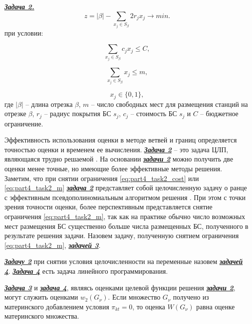 \underline{\textit{\textbf{Задача 2.}}}
\begin{displaymath}
    z = |\beta| - \sum\limits_{x_j \in S_\beta} 2r_j x_j \rightarrow min.
\end{displaymath}
при условии:

\begin{equation}\label{eq:part4_task2_cost}
    \sum\limits_{x_j \in S_\beta} c_j x_j \leqslant C,
\end{equation}

\begin{equation}\label{eq:part4_task2_m}
    \sum\limits_{x_j \in S_\beta} x_j \leqslant m,
\end{equation}

\begin{displaymath}
    x_j \in \{0, 1\},
\end{displaymath}
где $|\beta|$ -- длина отрезка $\beta$, $m$ -- число свободных мест для размещения станций на отрезке $\beta$, $r_j$ -- радиус покрытия БС $s_j$, $c_j$ -- стоимость БС $s_j$ и $C$ -- бюджетное ограничение.

Эффективность использования оценки в методе ветвей и границ определяется точностью оценки и временем ее вычисления. \underline{\textit{\textbf{Задача 2}}} -- это задача ЦЛП, являющаяся трудно решаемой \cite{Gari}. На основании \underline{\textit{\textbf{задачи 2}}} можно получить две оценки менее точные, но имеющие более эффективные методы решения. Заметим, что при снятии ограничения \cref{eq:part4_task2_cost} или \cref{eq:part4_task2_m} \underline{\textit{\textbf{задача 2}}} представляет собой целочисленную задачу о ранце с эффективным псевдополиномиальным алгоритмом решения \cite{Gari}. При этом с точки зрения точности оценки, более перспективным представляется снятие ограничения \cref{eq:part4_task2_m}, так как на практике обычно число возможных мест размещения БС существенно больше числа размещенных БС, полученного в результате решения задачи. Назовем задачу, полученную снятием ограничения \cref{eq:part4_task2_m}, \underline{\textit{\textbf{задачей 3}}}.

\underline{\textit{\textbf{Задачу 2}}} при снятии условия целочисленности на переменные назовем \underline{\textit{\textbf{задачей 4}}}. \underline{\textit{\textbf{Задача 4}}} есть задача линейного программирования. 

\underline{\textit{\textbf{Задача 3}}} и \underline{\textit{\textbf{задача 4}}}, являясь оценками целевой функции решения \underline{\textit{\textbf{задачи 2}}}, могут служить оценками $w_2 (G_\nu)$. Если множество $G_\nu$ получено из материнского добавлением условия $\pi_{kt}=0$, то оценка $W(G_\nu)$ равна оценке материнского множества.

